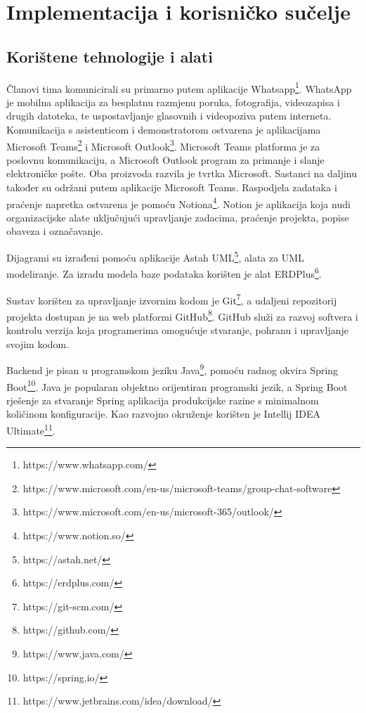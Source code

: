 \chapter{Implementacija i korisničko sučelje}
		
		
		\section{Korištene tehnologije i alati}
					
					
			Članovi tima komunicirali su primarno putem aplikacije Whatsapp\footnote{https://www.whatsapp.com/}. WhatsApp je mobilna aplikacija za besplatnu razmjenu poruka, fotografija, videozapisa i drugih datoteka, te uspostavljanje glasovnih i videopoziva putem interneta. Komunikacija s asistenticom i demonstratorom ostvarena je aplikacijama Microsoft Teams\footnote{https://www.microsoft.com/en-us/microsoft-teams/group-chat-software} i Microsoft Outlook\footnote{https://www.microsoft.com/en-us/microsoft-365/outlook/}. Microsoft Teams platforma je za poslovnu komunikaciju, a Microsoft Outlook program za primanje i slanje elektroničke pošte. Oba proizvoda razvila je tvrtka Microsoft. Sastanci na daljinu također su održani putem aplikacije Microsoft Teams. Raspodjela zadataka i praćenje napretka ostvarena je pomoću Notiona\footnote{https://www.notion.so/}. Notion je aplikacija koja nudi organizacijske alate uključujući upravljanje zadacima, praćenje projekta, popise obaveza i označavanje.
			
			Dijagrami su izrađeni pomoću aplikacije Astah UML\footnote{https://astah.net/}, alata za UML modeliranje. Za izradu modela baze podataka korišten je alat ERDPlus\footnote{https://erdplus.com/}.
			
			Sustav korišten za upravljanje izvornim kodom je Git\footnote{https://git-scm.com/}, a udaljeni repozitorij projekta dostupan je na web platformi GitHub\footnote{https://github.com/}. GitHub služi za razvoj softvera i kontrolu verzija koja programerima omogućuje stvaranje, pohranu i upravljanje svojim kodom.
			
			Backend je pisan u programskom jeziku Java\footnote{https://www.java.com/}, pomoću radnog okvira Spring Boot\footnote{https://spring.io/}. Java je popularan objektno orijentiran programski jezik, a Spring Boot rješenje za stvaranje Spring aplikacija produkcijske razine s minimalnom količinom konfiguracije. Kao razvojno okruženje korišten je Intellij IDEA Ultimate\footnote{https://www.jetbrains.com/idea/download/}.
			
